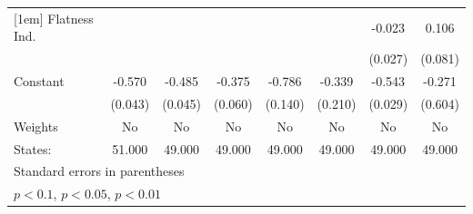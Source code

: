 {\begin{tabular}{l*{7}{c}}
[1em]
Flatness Ind.&                     &                     &                     &                     &                     &      -0.023         &       0.106         \\
            &                     &                     &                     &                     &                     &     (0.027)         &     (0.081)         \\
[1em]
Constant    &      -0.570\sym{***}&      -0.485\sym{***}&      -0.375\sym{***}&      -0.786\sym{***}&      -0.339         &      -0.543\sym{***}&      -0.271         \\
            &     (0.043)         &     (0.045)         &     (0.060)         &     (0.140)         &     (0.210)         &     (0.029)         &     (0.604)         \\
\hline
Weights     &          No         &          No         &          No         &          No         &          No         &          No         &          No         \\
States:     &      51.000         &      49.000         &      49.000         &      49.000         &      49.000         &      49.000         &      49.000         \\
\hline\hline
\multicolumn{8}{l}{\footnotesize Standard errors in parentheses}\\
\multicolumn{8}{l}{\footnotesize \sym{*} \(p<0.1\), \sym{**} \(p<0.05\), \sym{***} \(p<0.01\)}\\
\end{tabular}
}
